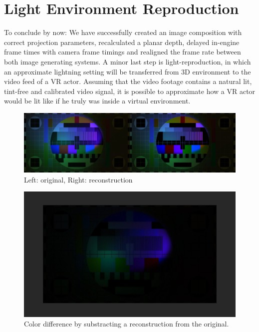 %
\section{Light Environment Reproduction}

To conclude by now: We have successfully created an image composition with 
correct projection parameters, recalculated a planar depth, delayed in-engine 
frame times with camera frame timings and realigned the frame rate between both 
image generating systems.
\newline
A minor last step is light-reproduction, in which an approximate lightning 
setting will be transferred from 3D environment to the video feed of a VR 
actor. Assuming that the video footage contains a natural lit, tint-free and 
calibrated video signal, it is possible to approximate how a VR actor would 
be lit like if he truly was inside a virtual environment.

\begin{figure}[htb]
	\includegraphics[width=\textwidth]{_raw_resources/light-reconstruction/comparison.jpg}
	\caption{Left: original, Right: reconstruction}
	\label{fig:light-reconstruction:comparison}
\end{figure}

\begin{figure}[htb]
	\includegraphics[width=\textwidth]{_raw_resources/light-reconstruction/color_difference.png}
	\caption{Color difference by substracting a reconstruction from the 
	original.}
	\label{fig:light-reconstruction:difference}
\end{figure}

